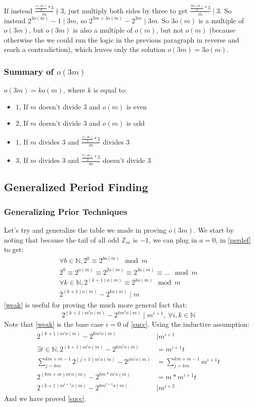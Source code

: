 \documentclass{article}
\begin{document}
  If instead $\frac{\frac{o(m)}{2} * 3}{m} \nmid 3$, just multiply both sides by three to get $\frac{\frac{3o(m)}{2} * 3}{m} \mid 3$. So instead $2^{3o(m)} - 1 \mid 3m$, so $2^{3m+3o(m)} - 2^{3m} \mid 3m$. So $3o(m)$ is a multiple of $o(3m)$, but $o(3m)$ is also a multiple of $o(m)$, but not $o(m)$ (because otherwise the we could run the logic in the previous paragraph in reverse and reach a contradiction), which leaves only the solution $o(3m) = 3o(m)$.
  \subsubsection{Summary of $o(3m)$}
  $o(3m) = ko(m)$, where $k$ is equal to:
  \begin{itemize}
  \item $1$, If $m$ doesn't divide 3 and $o(m)$ is even
  \item $2$, If $m$ doesn't divide 3 and $o(m)$ is odd
  \item $1$, If $m$ divides 3 and $\frac{\frac{o(m)}{2} * 3}{m}$ divides 3
  \item $3$, If $m$ divides 3 and $\frac{\frac{o(m)}{2} * 3}{m}$ doesn't divide 3
  \end{itemize}
  \subsection{Generalized Period Finding}
  \subsubsection{Generalizing Prior Techniques}
  Let's try and generalize the table we made in proving $o(3m)$. We start by noting that because the tail of all odd $\mathbb{Z}_m$ is $-1$, we can plug in $a=0$, in  \eqref{perdef} to get:
  \begin{align}
    \forall b \in \mathbb{N}, 2^{0} \equiv 2^{bo(m)} \mod m\\
    2^0 \equiv 2^{o(m)} \equiv 2^{2o(m)}\equiv 2^{3o(m)} \equiv ... \mod m\\
    \forall k \in \mathbb{N}, 2^{(k+1)o(m)} \equiv 2^{ko(m)} \mod m\\
    2^{(k+1)o(m)} - 2^{ko(m)} \mid m \label{weak}
  \end{align}
  \eqref{weak} is useful for proving the much more general fact that:
  \begin{equation}\label{succ}
    2^{(k+1)m^io(m)} - 2^{km^io(m)} \mid m^{i+1},\  \forall i, k \in \mathbb{N}
  \end{equation}
  Note that \eqref{weak} is the base case $i=0$ of \eqref{succ}. Using the inductive assumption:
  \begin{align}
    2^{(k+1)m^io(m)} - 2^{km^io(m)} &\mid m^{i+1}\\
    \exists t \in \mathbb{N}, 2^{(k+1)m^io(m)} - 2^{km^io(m)} &= m^{i+1}t\\
    \sum^{km+m-1}_{j=km}2^{(j+1)m^io(m)} - 2^{jm^io(m)} &= \sum^{km+m-1}_{j=km}m^{i+1}t\\
    2^{(km+m)m^io(m)} - 2^{km*m^{i}o(m)} &= m * m^{i+1}t\\
    2^{(k+1)m^{i+1}o(m)} - 2^{km^{i+1}o(m)} &\mid  m^{i+2}
  \end{align}
  And we have proved \eqref{succ}.
\end{document}
